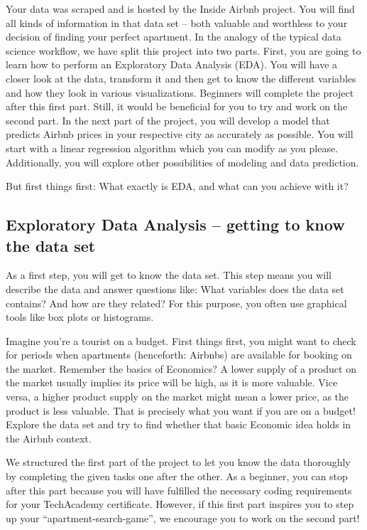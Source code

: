 \documentclass[
  11pt,
]{article}
\begin{document}
Your data was scraped and is hosted by the Inside Airbnb project. You will find all kinds of information in that data set -- both valuable and worthless to your decision of finding your perfect apartment.
In the analogy of the typical data science workflow, we have split this project into two parts. First, you are going to learn how to perform an Exploratory Data Analysis (EDA). You will have a closer look at the data, transform it and then get to know the different variables and how they look in various visualizations. Beginners will complete the project after this first part. Still, it would be beneficial for you to try and work on the second part. In the next part of the project, you will develop a model that predicts Airbnb prices in your respective city as accurately as possible. You will start with a linear regression algorithm which you can modify as you please. Additionally, you will explore other possibilities of modeling and data prediction.

But first things first: What exactly is EDA, and what can you achieve with it?

\hypertarget{exploratory-data-analysis-getting-to-know-the-data-set}{%
\subsection{Exploratory Data Analysis -- getting to know the data set}\label{exploratory-data-analysis-getting-to-know-the-data-set}}

As a first step, you will get to know the data set. This step means you will describe the data and answer questions like: What variables does the data set contains? And how are they related? For this purpose, you often use graphical tools like box plots or histograms.

Imagine you're a tourist on a budget. First things first, you might want to check for periods when apartments (henceforth: Airbnbs) are available for booking on the market. Remember the basics of Economics? A lower supply of a product on the market usually implies its price will be high, as it is more valuable. Vice versa, a higher product supply on the market might mean a lower price, as the product is less valuable. That is precisely what you want if you are on a budget! Explore the data set and try to find whether that basic Economic idea holds in the Airbnb context.

We structured the first part of the project to let you know the data thoroughly by completing the given tasks one after the other. As a beginner, you can stop after this part because you will have fulfilled the necessary coding requirements for your TechAcademy certificate. However, if this first part inspires you to step up your ``apartment-search-game'', we encourage you to work on the second part!
\end{document}

